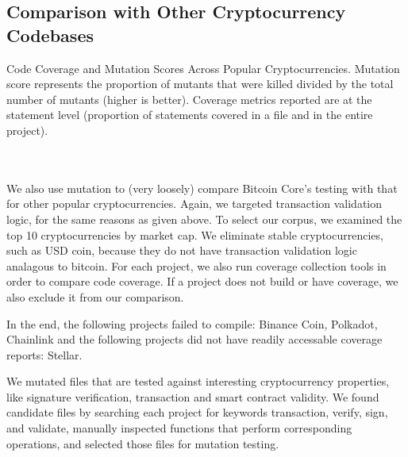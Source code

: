 \subsection{Comparison with Other Cryptocurrency Codebases}

\begin{table}[ht!]
\vspace{2mm}

\caption{Code Coverage and Mutation Scores Across Popular Cryptocurrencies. Mutation score represents the proportion of mutants that were killed divided by the total number of mutants (higher is better). Coverage
metrics reported are at the statement level (proportion of statements covered in a file and in the entire project).
\\ 
\\ 
\\ 
}
\label{tab:comparison}
\end{table}

We also use mutation to (very loosely) compare Bitcoin Core's testing
with that for other popular cryptocurrencies. Again, we targeted
transaction validation logic, for the same reasons as given above. To select
our corpus, we examined the top 10 cryptocurrencies by market cap. We eliminate stable cryptocurrencies, such as USD coin,
because they do not have transaction validation logic analagous to bitcoin. For each project, we also run coverage collection
tools in order to compare code coverage. If a project does not build or have coverage, we also exclude it from our comparison.

In the end, the following projects failed to compile: Binance Coin, Polkadot, Chainlink and the following projects did not have
readily accessable coverage reports: Stellar.

We mutated files that are tested against interesting cryptocurrency properties, like signature verification, transaction and smart contract validity.
We found candidate files by searching each project for keywords transaction, verify, sign, and validate, manually inspected functions that perform corresponding operations,
and selected those files for mutation testing.

